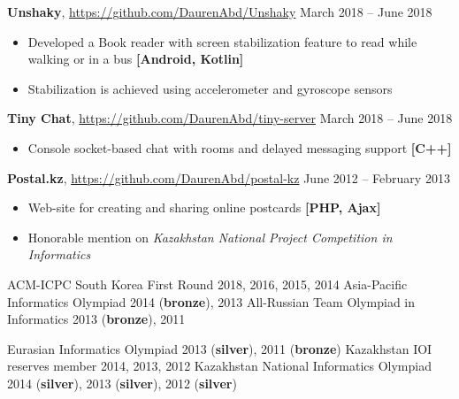 \documentclass[10pt,a4paper]{altacv}
\begin{document}
\cveventflat
    {\textbf{Unshaky}, }
    {{\url{https://github.com/DaurenAbd/Unshaky}}}
    {March 2018 -- June 2018}{}
\medskip
\begin{itemize}
\item Developed a Book reader with screen stabilization feature to read while walking or in a bus
    \textbf{[Android, Kotlin]}
\item Stabilization is achieved using accelerometer and gyroscope sensors
\end{itemize}
\medskip

\cveventflat
    {\textbf{Tiny Chat}, }
    {{\url{https://github.com/DaurenAbd/tiny-server}}}
    {March 2018 -- June 2018}{}
\medskip
\begin{itemize}
\item Console socket-based chat with rooms and delayed messaging support 
    \textbf{[C++]}
\end{itemize}
\medskip

\cveventflat
    {\textbf{Postal.kz}, }
    {{\url{https://github.com/DaurenAbd/postal-kz}}}
    {June 2012 -- February 2013}{}
\medskip
\begin{itemize}
\item Web-site for creating and sharing online postcards 
    \textbf{[PHP, Ajax]}
\item Honorable mention on 
    \textit{Kazakhstan National Project Competition in Informatics}
\end{itemize}

\parbox{0.5\textwidth}{
\cvachievement
    {}
    {ACM-ICPC South Korea First Round}
    {2018, 2016, 2015, 2014}
\cvachievement
    {\faTrophy}
    {Asia-Pacific Informatics Olympiad}
    {2014 (\textbf{bronze}), 2013}
\cvachievement
    {\faTrophy}
    {All-Russian Team Olympiad in Informatics}
    {2013 (\textbf{bronze}), 2011}}
\parbox{0.45\textwidth}{
\cvachievement
    {\faTrophy}
    {Eurasian Informatics Olympiad}
    {2013 (\textbf{silver}), 2011 (\textbf{bronze})}
\cvachievement
    {}
    {Kazakhstan IOI reserves member}
    {2014, 2013, 2012}
\cvachievement
    {\faTrophy}
    {Kazakhstan National Informatics Olympiad}
    {2014 (\textbf{silver}), 2013 (\textbf{silver}), 2012 (\textbf{silver})}}

\clearpage

\end{document}
